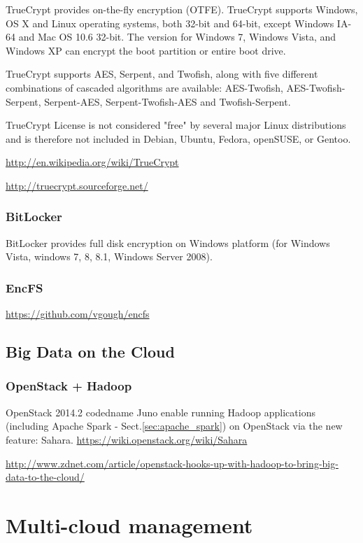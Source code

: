 TrueCrypt provides on-the-fly encryption (OTFE).
TrueCrypt supports Windows, OS X and Linux operating systems, both 32-bit and
64-bit, except Windows IA-64 and Mac OS 10.6 32-bit. The version for Windows 7,
Windows Vista, and Windows XP can encrypt the boot partition or entire boot
drive.

TrueCrypt supports  AES, Serpent, and Twofish, along with five different
combinations of cascaded algorithms are available: AES-Twofish,
AES-Twofish-Serpent, Serpent-AES, Serpent-Twofish-AES and Twofish-Serpent. 

TrueCrypt License is not considered "free" by several major Linux distributions
and is therefore not included in Debian, Ubuntu, Fedora,
openSUSE, or Gentoo. 

\url{http://en.wikipedia.org/wiki/TrueCrypt}


\url{http://truecrypt.sourceforge.net/}

\subsection{BitLocker}

BitLocker provides full disk encryption on Windows platform (for Windows Vista,
windows 7, 8, 8.1, Windows Server 2008). 

\subsection{EncFS}
\label{sec:EncFS}

\url{https://github.com/vgough/encfs}

\section{Big Data on the Cloud }
\label{sec:BigData-on-Cloud}

\subsection{OpenStack + Hadoop}
\label{sec:OpenStack+Hadoop}

OpenStack 2014.2 codedname Juno enable running Hadoop applications (including
Apache Spark - Sect.\ref{sec:apache_spark}) on OpenStack via the new feature:
Sahara.
\url{https://wiki.openstack.org/wiki/Sahara}

\url{http://www.zdnet.com/article/openstack-hooks-up-with-hadoop-to-bring-big-data-to-the-cloud/}

\chapter{Multi-cloud management}
\label{chap:multi-cloud-management}


